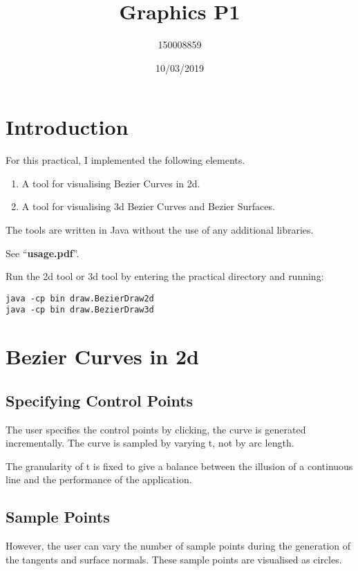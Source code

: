 \documentclass{article}
\title{Graphics P1}
\date{10/03/2019}
\author{150008859}
\begin{document}
\maketitle

\section{Introduction}

For this practical, I implemented the following elements.

\begin{enumerate}
  \item A tool for visualising Bezier Curves in 2d.
  \item A tool for visualising 3d Bezier Curves and Bezier Surfaces.
\end{enumerate}

The tools are written in Java without the use of any additional libraries.

See ``\textbf{usage.pdf}''. 

Run the 2d tool or 3d tool by entering the practical directory and running:

\begin{verbatim}
java -cp bin draw.BezierDraw2d
java -cp bin draw.BezierDraw3d
\end{verbatim}

\section{Bezier Curves in 2d}

\subsection{Specifying Control Points}

The user specifies the control points by clicking, the curve is generated incrementally. The curve is sampled by varying t, not by arc length.

The granularity of t is fixed to give a balance between the illusion of a continuous line and the performance of the application.

\subsection{Sample Points}

However, the user can vary the number of sample points during the generation of the tangents and surface normals. These sample points are visualised as circles.
\end{document}
